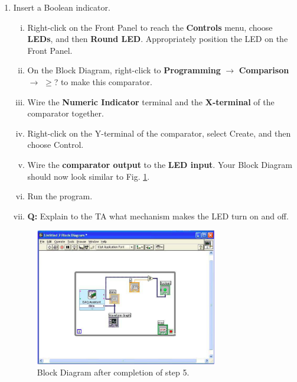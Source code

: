 \documentclass[12pt]{article}
\begin{document}
\begin{enumerate}[1.]
	\item Insert a Boolean indicator.
	\begin{enumerate}[i.]
		\item Right-click on the Front Panel to reach the {\bf Controls} menu, choose {\bf LEDs}, and then
{\bf Round LED}. Appropriately position the LED on the Front Panel.
		\item On the Block Diagram, right-click to {\bf Programming} $\rightarrow$ {\bf Comparison} $\rightarrow$ $\mathbf{\geq}$? to make this comparator.
		\item Wire the {\bf Numeric Indicator} terminal and the {\bf X-terminal} of the comparator together.
		\item Right-click on the Y-terminal of the comparator, select Create, and then choose
Control.
		\item Wire the {\bf comparator output} to the {\bf LED input}. Your Block Diagram should now look similar to Fig. \ref{fig:4}.
		\item Run the program.
		\item {\bf Q:} Explain to the TA what mechanism makes the LED turn on and off.
	\end{enumerate}
	
	\begin{figure}[!ht]
	\begin{center}
	\includegraphics[width=0.75\textwidth,trim=0 0 0 0,clip=false]{lab1fig4.png}
	\caption{Block Diagram after completion of step 5.}
	\label{fig:4}
	\end{center}
	\end{figure}
	

\end{enumerate}
\end{document}

